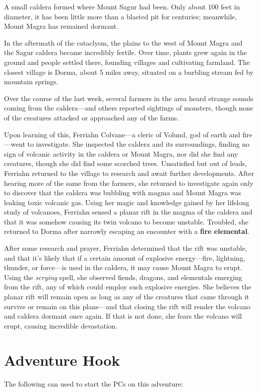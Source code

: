 \documentclass[10pt,a4paper,twoside,bg=print,twocolumn,openany,nodeprecatedcode]{dndbook}
\begin{document}
A small caldera formed where Mount Sagur had been. Only about 100 feet in diameter, it has been little more than a blasted pit for centuries; meanwhile, Mount Magra has remained dormant.

In the aftermath of the cataclysm, the plains to the west of Mount Magra and the Sagur caldera became incredibly fertile. Over time, plants grew again in the ground and people settled there, founding villages and cultivating farmland. The closest village is Dorma, about 5 miles away, situated on a burbling stream fed by mountain springs.

Over the course of the last week, several farmers in the area heard strange sounds coming from the caldera—and others reported sightings of monsters, though none of the creatures attacked or approached any of the farms.

Upon learning of this, Ferriahn Colvane—a cleric of Volund, god of earth and fire—went to investigate. She inspected the caldera and its surroundings, finding no sign of volcanic activity in the caldera or Mount Magra, nor did she find any creatures, though she did find some scorched trees. Unsatisfied but out of leads, Ferriahn returned to the village to research and await further developments. After hearing more of the same from the farmers, she returned to investigate again only to discover that the caldera was bubbling with magma and Mount Magra was leaking toxic volcanic gas. Using her magic and knowledge gained by her lifelong study of volcanoes, Ferriahn sensed a planar rift in the magma of the caldera and that it was somehow causing its twin volcano to become unstable. Troubled, she returned to Dorma after narrowly escaping an encounter with a \textbf{fire elemental}.

After some research and prayer, Ferriahn determined that the rift was unstable, and that it's likely that if a certain amount of explosive energy—fire, lightning, thunder, or force—is used in the caldera, it may cause Mount Magra to erupt. Using the \textit{scrying} spell, she observed fiends, dragons, and elementals emerging from the rift, any of which could employ such explosive energies. She believes the planar rift will remain open as long as any of the creatures that came through it survive or remain on this plane—and that closing the rift will render the volcano and caldera dormant once again. If that is not done, she fears the volcano will erupt, causing incredible devastation.

\section{Adventure Hook}
The following can used to start the PCs on this adventure:
\end{document}
